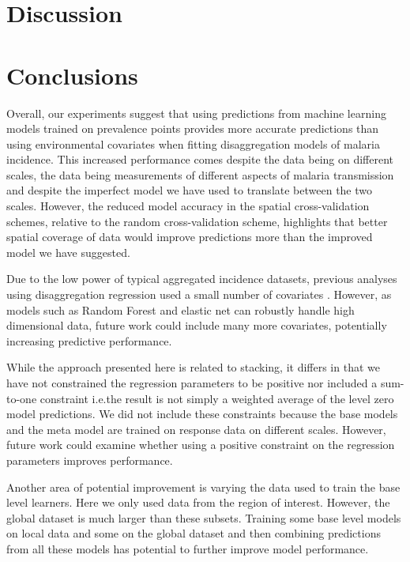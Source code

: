 \documentclass[11pt]{article}
\begin{document}
\section{Discussion}

\section{Conclusions}

Overall, our experiments suggest that using predictions from machine learning models trained on prevalence points provides more accurate predictions than using environmental covariates when fitting disaggregation models of malaria incidence.
This increased performance comes despite the data being on different scales, the data being measurements of different aspects of malaria transmission and despite the imperfect model we have used to translate between the two scales.
However, the reduced model accuracy in the spatial cross-validation schemes, relative to the random cross-validation scheme, highlights that better spatial coverage of data would improve predictions more than the improved model we have suggested.

Due to the low power of typical aggregated incidence datasets, previous analyses using disaggregation regression used a small number of covariates \citep{sturrock2014fine}.
However, as models such as Random Forest and elastic net can robustly handle high dimensional data, future work could include many more covariates, potentially increasing predictive performance.




While the approach presented here is related to stacking, it differs in that we have not constrained the regression parameters to be positive nor included a sum-to-one constraint i.e.\thinspace the result is not simply a weighted average of the level zero model predictions.
We did not include these constraints because the base models and the meta model are trained on response data on different scales.
However, future work could examine whether using a positive constraint on the regression parameters improves performance.

Another area of potential improvement is varying the data used to train the base level learners.
Here we only used data from the region of interest.
However, the global dataset is much larger than these subsets.
Training some base level models on local data and some on the global dataset and then combining predictions from all these models has potential to further improve model performance.


 

\end{document}
